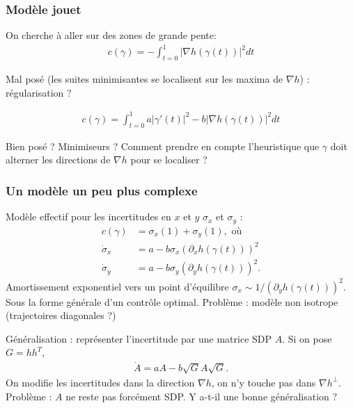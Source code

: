 \documentclass[11pt]{beamer}
\begin{document}




\begin{frame}
  \frametitle{Modèle jouet}
  On cherche à aller sur des zones de grande pente:
  \begin{align*}
    c(\gamma) = -\int_{t=0}^{1} |\nabla h(\gamma(t))|^{2}  dt
  \end{align*}

  Mal posé (les suites minimisantes se localisent sur les maxima de
  $\nabla h$) : régularisation ?
  
\begin{align*}
  c(\gamma) =  \int_{t=0}^{1} a |\gamma'(t)|^{2} - b |\nabla
  h(\gamma(t))|^{2} dt
\end{align*}

Bien posé ? Minimiseurs ? Comment prendre en compte l'heuristique que
$\gamma$ doit alterner les directions de $\nabla h$ pour se localiser ?


\end{frame}
\begin{frame}
  \frametitle{Un modèle un peu plus complexe}
Modèle effectif pour les incertitudes en $x$ et $y$ $\sigma_{x}$ et
$\sigma_{y}$ :
\begin{align*}
  c(\gamma) &= \sigma_{x}(1) + \sigma_{y}(1), \text{ où}\\
  \dot \sigma_{x} &= a - b \sigma_{x} (\partial_{x} h(\gamma(t)))^{2}\\
  \dot \sigma_{y} &= a - b \sigma_{y} (\partial_{y} h(\gamma(t)))^{2}.
\end{align*}
Amortissement exponentiel vers un point d'équilibre $\sigma_{x} \sim
1/(\partial_{y} h(\gamma(t)))^{2}$. Sous la forme générale d'un
contrôle optimal. Problème : modèle non isotrope (trajectoires
diagonales ?)

Généralisation : représenter l'incertitude par une matrice SDP $A$. Si
on pose $G = h h^{T}$,
\begin{align*}
  \dot A = a A - b \sqrt G A \sqrt G.
\end{align*}
On modifie les incertitudes dans la direction $\nabla h$, on n'y
touche pas dans $\nabla h^{\perp}$. Problème : $A$ ne reste
pas forcément SDP. Y a-t-il une bonne généralisation ?
\end{frame}
\end{document}
